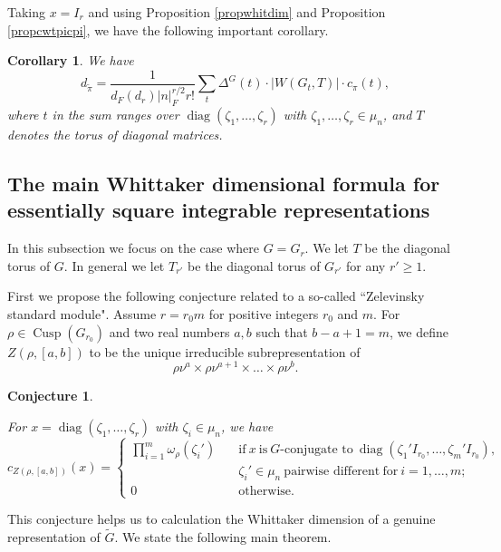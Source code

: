 \documentclass{amsart}
\numberwithin{equation}{section}
\newtheorem{corollary}[theorem]{\bf{Corollary}}
\newtheorem{conjecture}[theorem]{\bf{Conjecture}}
\newcommand{\abs}[1]{\left|#1\right|_{F}}
\newcommand{\car}[1]{\left|#1\right|}
\newcommand{\mrdiag}{\operatorname{diag}}
\newcommand{\mrcusp}{\operatorname{Cusp}}
\newcommand{\mrsqrt}{\operatorname{Sqrt}}
\newcommand{\mrmc}{\operatorname{MC}}
\newcommand{\dF}[1]{d_{F}(#1)}
\newcommand{\wt}[1]{\widetilde{#1}}
\begin{document}
	Taking $x=I_{r}$ and using Proposition \ref{propwhitdim} and Proposition \ref{propcwtpicpi}, we have the following important corollary.
	
	\begin{corollary}
		We have
		\begin{equation}\label{eqwhitdim}
			d_{\wt{\pi}}=\frac{1}{\dF{d_{r}}\abs{n}^{r/2}r!}\sum_{t}\Delta^{G}(t)\cdot\car{W(G_{t},T)}\cdot c_{\pi}(t),	
		\end{equation}
		where $t$ in the sum ranges over $\mrdiag(\zeta_{1},\dots,\zeta_{r})$ with $\zeta_{1},\dots,\zeta_{r}\in\mu_{n}$, and $T$ denotes the torus of diagonal matrices.
		
	\end{corollary}
	
	
	\subsection{The main Whittaker dimensional formula for essentially square integrable representations}
	
	In this subsection we focus on the case where $G=G_{r}$. We let $T$ be the diagonal torus of $G$. In general we let $T_{r'}$ be the diagonal torus of $G_{r'}$ for any $r'\geq 1$.
	
	First we propose the following conjecture related to a so-called ``Zelevinsky standard module". Assume $r=r_{0}m$ for positive integers $r_{0}$ and $m$. For $\rho\in\mrcusp(G_{r_{0}})$ and two real numbers $a,b$ such that $b-a+1=m$, we define
	$Z(\rho,[a,b])$ to be the unique irreducible subrepresentation of 
	$$\rho\nu^{a}\times\rho\nu^{a+1}\times\dots\times\rho\nu^{b}.$$
	
	\begin{conjecture}\label{conjmain}
		
		For $x=\mrdiag(\zeta_{1},\dots,\zeta_{r})$ with $\zeta_{i}\in\mu_{n}$, we have
		$$c_{Z(\rho,[a,b])}(x)=\begin{cases} \prod_{i=1}^{m}\omega_{\rho}(\zeta_{i}')\quad&\text{if}\ x\ \text{is}\ G\text{-conjugate to}\ \mrdiag(\zeta_{1}'I_{r_{0}},\dots, \zeta_{m}'I_{r_{0}}),\\ & \zeta_{i}'\in \mu_{n}\ \text{pairwise different}\ \text{for}\ i=1,\dots,m; \\
			0\quad &\text{otherwise}.
		\end{cases}$$
		
	\end{conjecture}
	
	This conjecture helps us to calculation the Whittaker dimension of a genuine representation of $\wt{G}$. We state the following main theorem.
	
\end{document}
